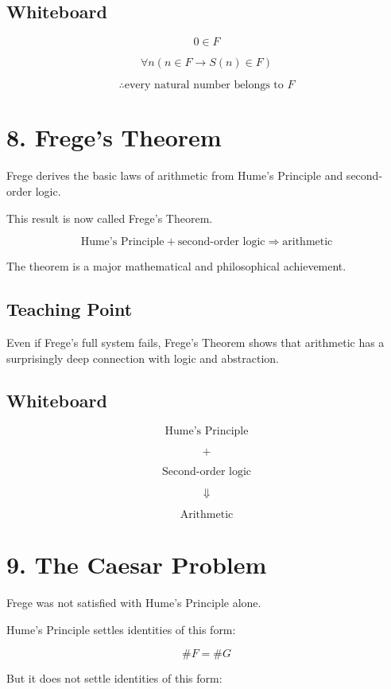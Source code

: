 \documentclass[11pt]{article}
\begin{document}
\subsection*{Whiteboard}

\[
0 \in F
\]

\[
\forall n(n \in F \rightarrow S(n) \in F)
\]

\[
\therefore
\text{every natural number belongs to }F
\]

\section*{8. Frege's Theorem}

Frege derives the basic laws of arithmetic from Hume's Principle and second-order logic.

This result is now called Frege's Theorem.

\[
\boxed{
\text{Hume's Principle} + \text{second-order logic}
\Rightarrow
\text{arithmetic}
}
\]

The theorem is a major mathematical and philosophical achievement.

\subsection*{Teaching Point}

Even if Frege's full system fails, Frege's Theorem shows that arithmetic has a surprisingly
deep connection with logic and abstraction.

\subsection*{Whiteboard}

\[
\text{Hume's Principle}
\]

\[
+
\]

\[
\text{Second-order logic}
\]

\[
\Downarrow
\]

\[
\text{Arithmetic}
\]

\section*{9. The Caesar Problem}

Frege was not satisfied with Hume's Principle alone.

Hume's Principle settles identities of this form:

\[
\#F = \#G
\]

But it does not settle identities of this form:
\end{document}
